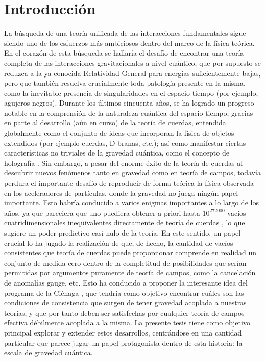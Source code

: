 \chapter*{Introducción}	\thispagestyle{simple}


La búsqueda de una teoría unificada de las interacciones fundamentales sigue siendo uno de los esfuerzos más ambiciosos dentro del marco de la física teórica. En el corazón de esta búsqueda se hallaría el desafío de encontrar una teoría completa de las interacciones gravitacionales a nivel cuántico, que por supuesto se reduzca a la ya conocida Relatividad General \cite{EinsteinGR} para energías suficientemente bajas, pero que también resuelva crucialmente toda patología presente en la misma, como la inevitable presencia de singularidades en el espacio-tiempo (por ejemplo, agujeros negros). Durante los últimos cincuenta años, se ha logrado un progreso notable en la comprensión de la naturaleza cuántica del espacio-tiempo, gracias en parte al desarrollo (aún en curso) de la teoría de cuerdas, entendida globalmente como el conjunto de ideas que incorporan la física de objetos extendidos (por ejemplo cuerdas, D-branas, etc.); así como manifestar ciertas características no triviales de la gravedad cuántica, como el concepto de holografía \cite{Maldacena:1997re, Witten:1998qj}. Sin embargo, a pesar del enorme éxito de la teoría de cuerdas al descubrir nuevos fenómenos tanto en gravedad como en teoría de campos, todavía perdura el importante desafío de reproducir de forma teórica la física observada en los aceleradores de partículas, donde la gravedad no juega ningún papel importante. Esto habría conducido a varios enigmas importantes a lo largo de los años, ya que pareciera que uno puediera obtener a priori hasta $10^{272000}$ vacíos cuatridimensionales inequivalentes directamente de teoría de cuerdas \cite{Taylor:2015xtz}, lo que sugiere un poder predictivo casi nulo de la teoría. En este sentido, un papel crucial lo ha jugado la realización de que, de hecho, la cantidad de vacíos consistentes que teoría de cuerdas puede proporcionar comprende en realidad un conjunto de medida cero dentro de la completitud de posibilidades que serían permitidas por argumentos puramente de teoría de campos, como la cancelación de anomalías gauge, etc. Esto ha conducido a proponer la interesante idea del programa de la Ciénaga \cite{Vafa:2005ui}, que tendría como objetivo encontrar cuáles son las condiciones de consistencia que surgen de tener gravedad acoplada a nuestras teorías, y que por tanto deben ser satisfechas por cualquier teoría de campos efectiva débilmente acoplada a la misma. La presente tesis tiene como objetivo principal explorar y extender estos desarrollos, centrándose en una cantidad particular que parece jugar un papel protagonista dentro de esta historia: la escala de gravedad cuántica.

